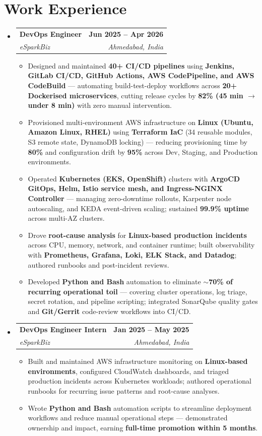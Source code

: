 \documentclass[letterpaper,11pt]{article}
\makeatletter
\newcommand{\resumeItem}[1]{
  \item\small{
    {#1 \vspace{-3pt}}
  }
}
\newcommand{\resumeSubheading}[4]{
  \vspace{-3pt}\item
    \begin{tabular*}{1.0\textwidth}[t]{l@{\extracolsep{\fill}}r}
      \textbf{#1} & \textbf{\small #2} \\
      \textit{\small#3} & \textit{\small #4} \\
    \end{tabular*}\vspace{-7pt}
}
\newcommand{\resumeSubHeadingListStart}{\begin{itemize}[leftmargin=0.0in, label={}]}
\newcommand{\resumeSubHeadingListEnd}{\end{itemize}}
\newcommand{\resumeItemListStart}{\begin{itemize}}
\newcommand{\resumeItemListEnd}{\end{itemize}\vspace{0pt}}
\makeatother
\begin{document}
\section{Work Experience}
  \resumeSubHeadingListStart
    \resumeSubheading
      {DevOps Engineer}{Jun 2025 -- Apr 2026}
      {eSparkBiz}{Ahmedabad, India}
      \resumeItemListStart
        \resumeItem{Designed and maintained \textbf{40+ CI/CD pipelines} using \textbf{Jenkins, GitLab CI/CD, GitHub Actions, AWS CodePipeline, and AWS CodeBuild} --- automating build-test-deploy workflows across \textbf{20+ Dockerised microservices}, cutting release cycles by \textbf{82\% (45 min $\rightarrow$ under 8 min)} with zero manual intervention.}
        \resumeItem{Provisioned multi-environment AWS infrastructure on \textbf{Linux (Ubuntu, Amazon Linux, RHEL)} using \textbf{Terraform IaC} (34 reusable modules, S3 remote state, DynamoDB locking) --- reducing provisioning time by \textbf{80\%} and configuration drift by \textbf{95\%} across Dev, Staging, and Production environments.}
        \resumeItem{Operated \textbf{Kubernetes (EKS, OpenShift)} clusters with \textbf{ArgoCD GitOps, Helm, Istio service mesh, and Ingress-NGINX Controller} --- managing zero-downtime rollouts, Karpenter node autoscaling, and KEDA event-driven scaling; sustained \textbf{99.9\% uptime} across multi-AZ clusters.}
        \resumeItem{Drove \textbf{root-cause analysis} for \textbf{Linux-based production incidents} across CPU, memory, network, and container runtime; built observability with \textbf{Prometheus, Grafana, Loki, ELK Stack, and Datadog}; authored runbooks and post-incident reviews.}
        \resumeItem{Developed \textbf{Python and Bash} automation to eliminate \textbf{$\sim$70\% of recurring operational toil} --- covering cluster operations, log triage, secret rotation, and pipeline scripting; integrated SonarQube quality gates and \textbf{Git/Gerrit} code-review workflows into CI/CD.}
      \resumeItemListEnd
    \resumeSubheading
      {DevOps Engineer Intern}{Jan 2025 -- May 2025}
      {eSparkBiz}{Ahmedabad, India}
      \resumeItemListStart
        \resumeItem{Built and maintained AWS infrastructure monitoring on \textbf{Linux-based environments}, configured CloudWatch dashboards, and triaged production incidents across Kubernetes workloads; authored operational runbooks for recurring issue patterns and root-cause analyses.}
        \resumeItem{Wrote \textbf{Python and Bash} automation scripts to streamline deployment workflows and reduce manual operational steps --- demonstrated ownership and impact, earning \textbf{full-time promotion within 5 months}.}
      \resumeItemListEnd
  \resumeSubHeadingListEnd
\end{document}
